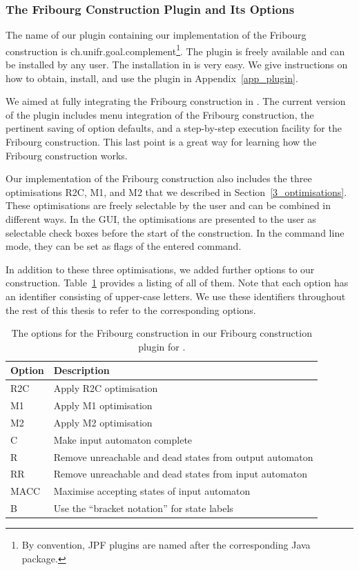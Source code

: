 \subsubsection{The Fribourg Construction Plugin and Its Options}
The name of our plugin containing our implementation of the Fribourg construction is \textsf{ch.unifr.goal.complement}\footnote{By convention, JPF plugins are named after the corresponding Java package.}. The plugin is freely available and can be installed by any \goal{} user. The installation in \goal{} is very easy. We give instructions on how to obtain, install, and use the plugin in Appendix~\ref{app_plugin}.

We aimed at fully integrating the Fribourg construction in \goal. The current version of the plugin includes menu integration of the Fribourg construction, the pertinent saving of option defaults, and a step-by-step execution facility for the Fribourg construction. This last point is a great way for learning how the Fribourg construction works.

Our implementation of the Fribourg construction also includes the three optimisations R2C, M1, and M2 that we described in Section~\ref{3_optimisations}. These optimisations are freely selectable by the user and can be combined in different ways. In the GUI, the optimisations are presented to the user as selectable check boxes before the start of the construction. In the command line mode, they can be set as flags of the entered command.

In addition to these three optimisations, we added further options to our construction. Table~\ref{goal_options} provides a listing of all of them. Note that each option has an identifier consisting of upper-case letters. We use these identifiers throughout the rest of this thesis to refer to the corresponding options.

\begin{table}
\centering
\begin{tabular}{ll}
\hline
Option & Description \\
\hline
R2C  & Apply R2C optimisation \\
M1   & Apply M1 optimisation \\
M2   & Apply M2 optimisation  \\
C    & Make input automaton complete \\
R    & Remove unreachable and dead states from output automaton \\
RR   & Remove unreachable and dead states from input automaton \\
MACC & Maximise accepting states of input automaton \\
B    & Use the ``bracket notation'' for state labels \\
\hline
\end{tabular}
\caption{The options for the Fribourg construction in our Fribourg construction plugin for \goal.}
\label{goal_options}
\end{table}

